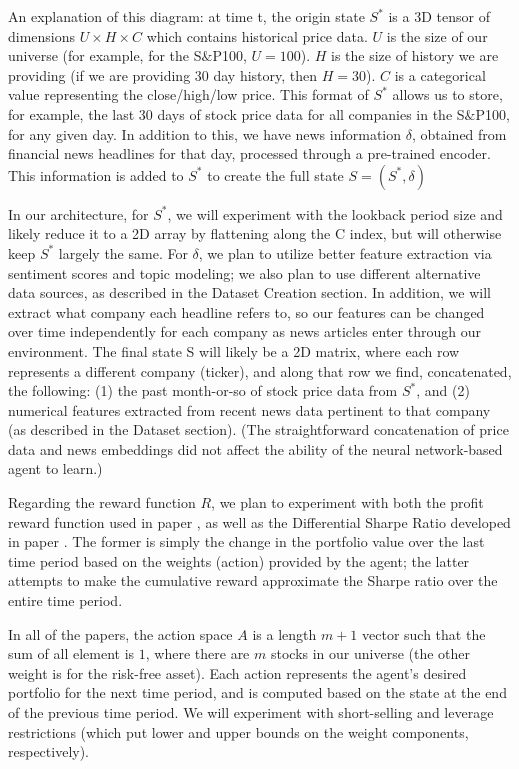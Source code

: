 An explanation of this diagram: at time t, the origin state $S^*$ is a 3D tensor of dimensions $U \times H \times C$
which contains historical price data. $U$ is the size of our universe (for example, for the S$\&$P100, $U = 100$). 
$H$ is the size of history we are providing (if we are providing 30 day history, then $H = 30$). 
$C$ is a categorical value representing the close/high/low price. This format of $S^*$ allows us to store, 
for example, the last 30 days of stock price data for all companies in the S$\&$P100, for any given day. 
In addition to this, we have news information $\delta$, obtained from financial news headlines for that day, 
processed through a pre-trained encoder. This information is added to $S^*$ to create the full state 
$S = (S^*, \delta)$

In our architecture, for $S^*$, we will experiment with the lookback period size and likely reduce it 
to a 2D array by flattening along the C index, but will otherwise keep $S^*$ largely the same. For 
$\delta$, we plan to utilize better feature extraction via sentiment scores and topic modeling; 
we also plan to use different alternative data sources, as described in the Dataset Creation section. 
In addition, we will extract what company each headline refers to, so our features can be changed 
over time independently for each company as news articles enter through our environment. The final 
state S will likely be a 2D matrix, where each row represents a different company (ticker), and along 
that row we find, concatenated, the following: (1) the past month-or-so of stock price data from $S^*$, 
and (2) numerical features extracted from recent news data pertinent to that company (as described 
in the Dataset section). (The straightforward concatenation of price data and news embeddings did not 
affect the ability of the neural network-based agent to learn.)

Regarding the reward function $R$, we plan to experiment with both the profit reward function used
in paper \cite{rl_augmented_states}, as well as the Differential Sharpe Ratio developed in paper \cite{drl_mvo}.
The former is simply the change in the portfolio value over the last time period based on the weights (action)
provided by the agent; the latter attempts to make the cumulative reward approximate the Sharpe ratio over the entire time period.

In all of the papers, the action space $A$ is a length $m+1$ vector such that the sum of all element is $1$,
where there are $m$ stocks in our universe (the other weight is for the risk-free asset).
Each action represents the agent’s desired portfolio for the next time period, and is computed based on the
state at the end of the previous time period. We will experiment with short-selling and leverage restrictions
(which put lower and upper bounds on the weight components, respectively).

